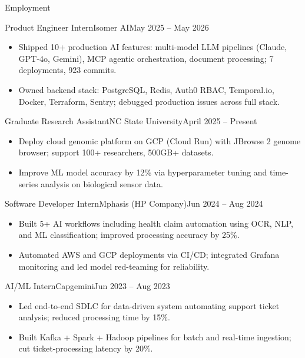 \documentclass[]{mcdowellcv}
\begin{document}
\makeheader

\begin{cvsection}{Employment}
  \begin{cvsubsection}{Product Engineer Intern}{Isomer AI}{May 2025 -- May 2026}
    \begin{itemize}
      \item Shipped 10+ production AI features: multi-model LLM pipelines (Claude, GPT-4o, Gemini), MCP agentic orchestration, document processing; 7 deployments, 923 commits.
      \item Owned backend stack: PostgreSQL, Redis, Auth0 RBAC, Temporal.io, Docker, Terraform, Sentry; debugged production issues across full stack.
    \end{itemize}
    \vspace{-1.5pt}
  \end{cvsubsection}

  \begin{cvsubsection}{Graduate Research Assistant}{NC State University}{April 2025 -- Present}
    \begin{itemize}
      \item Deploy cloud genomic platform on GCP (Cloud Run) with JBrowse 2 genome browser; support 100+ researchers, 500GB+ datasets.
      \item Improve ML model accuracy by 12\% via hyperparameter tuning and time-series analysis on biological sensor data.
    \end{itemize}
    \vspace{-1.5pt}
  \end{cvsubsection}

  \begin{cvsubsection}{Software Developer Intern}{Mphasis (HP Company)}{Jun 2024 -- Aug 2024}
    \begin{itemize}
      \item Built 5+ AI workflows including health claim automation using OCR, NLP, and ML classification; improved processing accuracy by 25\%.
      \item Automated AWS and GCP deployments via CI/CD; integrated Grafana monitoring and led model red-teaming for reliability.
    \end{itemize}
    \vspace{-1.5pt}
  \end{cvsubsection}

  \begin{cvsubsection}{AI/ML Intern}{Capgemini}{Jun 2023 -- Aug 2023}
    \begin{itemize}
      \item Led end-to-end SDLC for data-driven system automating support ticket analysis; reduced processing time by 15\%.
      \item Built Kafka + Spark + Hadoop pipelines for batch and real-time ingestion; cut ticket-processing latency by 20\%.
    \end{itemize}
    \vspace{-1.5pt}
  \end{cvsubsection}
\end{cvsection}
\end{document}
